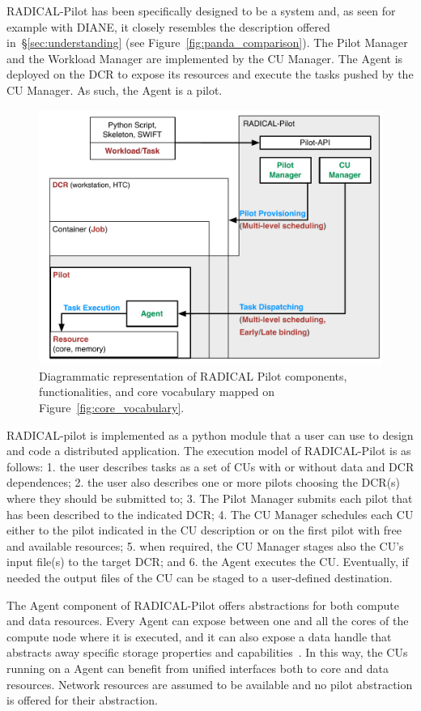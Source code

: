 \documentclass{sig-alternate}
\begin{document}
RADICAL-Pilot has been specifically designed to be a \pilot system and, as seen
for example with DIANE, it closely resembles the description offered
in~\S\ref{sec:understanding} (see Figure~\ref{fig:panda_comparison}). The Pilot
Manager and the Workload Manager are implemented by the CU Manager. The Agent is
deployed on the DCR to expose its resources and execute the tasks pushed by the
CU Manager. As such, the Agent is a pilot.

\begin{figure}[t]
    \centering
        \includegraphics[width=.48\textwidth]{figures/radicalp_comparison.pdf}
    \caption{Diagrammatic representation of RADICAL Pilot components,
    functionalities, and core vocabulary mapped on
    Figure~\ref{fig:core_vocabulary}.}
    \label{fig:rp_comparison}
\end{figure}

RADICAL-pilot is implemented as a python module that a user can use to design
and code a distributed application. The execution model of RADICAL-Pilot is as
follows: 1. the user describes tasks as a set of CUs with or without data and
DCR dependences; 2. the user also describes one or more pilots choosing the
DCR(s) where they should be submitted to; 3. The Pilot Manager submits each
pilot that has been described to the indicated DCR; 4. The CU Manager schedules
each CU either to the pilot indicated in the CU description or on the first
pilot with free and available resources; 5. when required, the CU Manager stages
also the CU's input file(s) to the target DCR; and 6. the Agent executes the CU.
Eventually, if needed the output files of the CU can be staged to a user-defined
destination.



The Agent component of RADICAL-Pilot offers abstractions for both compute and
data resources. Every Agent can expose between one and all the cores of the
compute node where it is executed, and it can also expose a data handle that
abstracts away specific storage properties and capabilities~\cite{luckow2010}.
In this way, the CUs running on a Agent can benefit from unified interfaces both
to core and data resources. Network resources are assumed to be available and no
pilot abstraction is offered for their abstraction.
\end{document}
